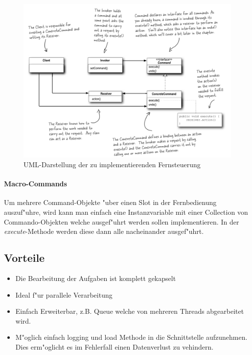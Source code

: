 \begin{figure}[b!]
	\centering
	\includegraphics[width=1\linewidth]{command/img/commandUML}
	\caption{UML-Darstellung der zu implementierenden Fernsteuerung}
	\label{fig:commandUML}
\end{figure}

\paragraph{Macro-Commands}
Um mehrere Command-Objekte "uber einen Slot in der Fernbedienung auszuf"uhre, wird kann man einfach eine Instanzvariable mit einer Collection von Commando-Objekten welche ausgef"uhrt werden sollen implementieren. In der \emph{execute}-Methode werden diese dann alle nacheinander ausgef"uhrt. 

\subsection{Vorteile}
\begin{itemize}
	\item Die Bearbeitung der Aufgaben ist komplett gekapselt
	\item Ideal f"ur parallele Verarbeitung
	\item Einfach Erweiterbar, z.B. Queue welche von mehreren Threads abgearbeitet wird. 
	\item M"oglich einfach logging und load Methode in die Schnittstelle aufzunehmen. Dies erm"oglicht es im Fehlerfall einen Datenverlust zu vehindern. 
\end{itemize}

